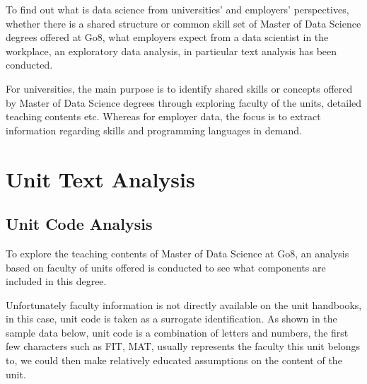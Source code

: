 \documentclass[
  letterpaper,
  DIV=11,
  numbers=noendperiod]{scrreport}
\begin{document}
To find out what is data science from universities' and employers'
perspectives, whether there is a shared structure or common skill set of
Master of Data Science degrees offered at Go8, what employers expect
from a data scientist in the workplace, an exploratory data analysis, in
particular text analysis has been conducted.

For universities, the main purpose is to identify shared skills or
concepts offered by Master of Data Science degrees through exploring
faculty of the units, detailed teaching contents etc. Whereas for
employer data, the focus is to extract information regarding skills and
programming languages in demand.

\hypertarget{unit-text-analysis}{%
\chapter{Unit Text Analysis}\label{unit-text-analysis}}

\hypertarget{sec-unit-code}{%
\section{Unit Code Analysis}\label{sec-unit-code}}

To explore the teaching contents of Master of Data Science at Go8, an
analysis based on faculty of units offered is conducted to see what
components are included in this degree.

Unfortunately faculty information is not directly available on the unit
handbooks, in this case, unit code is taken as a surrogate
identification. As shown in the sample data below, unit code is a
combination of letters and numbers, the first few characters such as
FIT, MAT, usually represents the faculty this unit belongs to, we could
then make relatively educated assumptions on the content of the unit.
\end{document}
